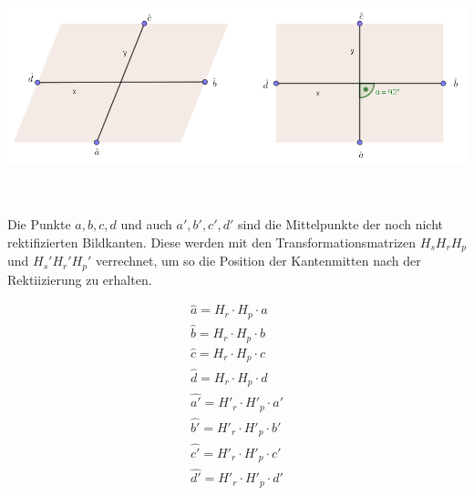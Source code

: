 \begin{minipage}{\linewidth}
	\centering
	\includegraphics[width=.8\linewidth]{images/Scherungstransformation.png}
	\label{fig:PreserveAspectRatio}
\end{minipage}\\ \\

Die Punkte $a,b,c,d$ und auch $a',b',c',d'$ sind die Mittelpunkte der noch nicht rektifizierten Bildkanten. Diese werden mit den Transformationsmatrizen $H_sH_rH_p$ und $H_s'H_r'H_p'$ verrechnet, um so die Position der Kantenmitten nach der Rektiizierung zu erhalten.


\begin{gather*}
	\hat{a} = H_r\cdot H_p \cdot a\\
	\hat{b} = H_r\cdot H_p \cdot b\\
	\hat{c} = H_r\cdot H_p \cdot c\\
	\hat{d} = H_r\cdot H_p \cdot d\\
	\hat{a'} = H'_r\cdot H'_p \cdot a'\\
	\hat{b'} = H'_r\cdot H'_p \cdot b'\\
	\hat{c'} = H'_r\cdot H'_p \cdot c'\\
	\hat{d'} = H'_r\cdot H'_p \cdot d'\\
\end{gather*}


